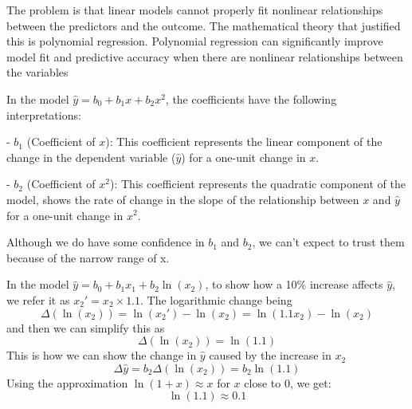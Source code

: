 \documentclass[12pt]{article}
\begin{document}
\begin{enumerate}


The problem is that linear models cannot properly fit nonlinear relationships between the predictors and the outcome. The mathematical theory that justified this is polynomial regression. Polynomial regression can significantly improve model fit and predictive accuracy when there are nonlinear relationships between the variables


In the model \( \hat{y} = b_0 + b_1x + b_2x^2 \), the coefficients have the following interpretations:

- \(b_1\) (Coefficient of \(x\)): This coefficient represents the linear component of the change in the dependent variable (\(\hat{y}\)) for a one-unit change in \(x\).

- \(b_2\) (Coefficient of \(x^2\)): This coefficient represents the quadratic component of the model, shows the rate of change in the slope of the relationship between \(x\) and \(\hat{y}\) for a one-unit change in \(x^2\).



Although we do have some confidence in $b_1$ and $b_2$, we can't expect to trust them because of the narrow range of x.


In the model \( \hat{y} = b_0 + b_1x_1 + b_2\ln(x_2) \), to show how a 10\% increase affects \( \hat{y} \), we refer it as \( x_2' = x_2 \times 1.1 \). The logarithmic change being 
\[ \Delta(\ln(x_2)) = \ln(x_2') - \ln(x_2) = \ln(1.1x_2) - \ln(x_2) \] 
and then we can simplify this as 
\[ \Delta(\ln(x_2)) = \ln(1.1) \] 
This is how we can show the change in \( \hat{y} \) caused by the increase in \( x_2 \)
\[ \Delta \hat{y} = b_2 \Delta(\ln(x_2)) = b_2\ln(1.1) \] 
Using the approximation \( \ln(1 + x) \approx x \) for \( x \) close to 0, we get:
\[ \ln(1.1) \approx 0.1 \]


\end{enumerate}
\end{document}

